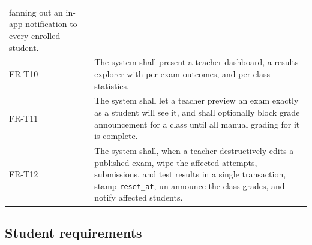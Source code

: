 \begin{table}[htbp]
\begin{tabularx}{\textwidth}{@{}L{1.6cm} X@{}}
fanning out an in-app notification to every enrolled student. \\
FR-T10 & The system shall present a teacher dashboard, a results explorer with per-exam
outcomes, and per-class statistics. \\
FR-T11 & The system shall let a teacher preview an exam exactly as a student will see it,
and shall optionally block grade announcement for a class until all manual grading for it
is complete. \\
FR-T12 & The system shall, when a teacher destructively edits a published exam, wipe the
affected attempts, submissions, and test results in a single transaction, stamp
\texttt{reset\_at}, un-announce the class grades, and notify affected students. \\
\bottomrule
\end{tabularx}
\end{table}

\subsection{Student requirements}
\label{sec:req-fr-student}

